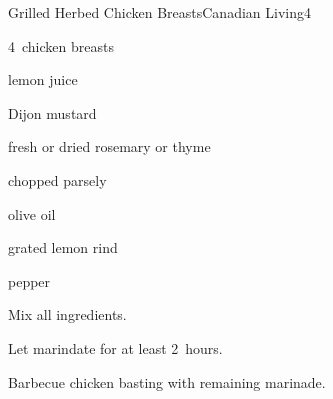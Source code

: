 \begin{recipe}{Grilled Herbed Chicken Breasts}{Canadian Living}{4}

\begin{ingredients}
\item 4~chicken breasts
\item \C{\half} lemon juice
\item \C{\quarter} Dijon mustard
\item {} fresh or  dried rosemary or thyme
\item {} chopped parsely
\item {} olive oil
\item {} grated lemon rind
\item \tp{\quarter} pepper
\end{ingredients}

\begin{directions}
\item Mix all ingredients.
\item Let marindate for at least 2~hours.
\item Barbecue chicken basting with remaining marinade.
\end{directions}

\end{recipe}
